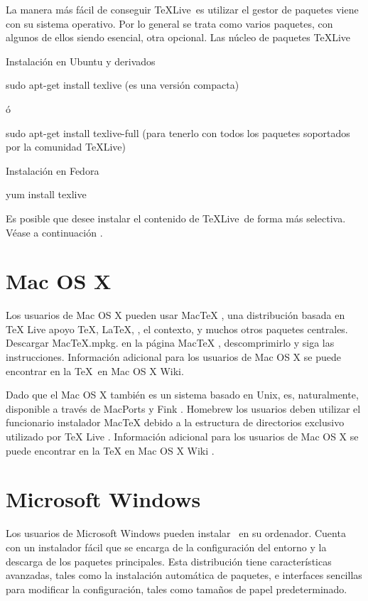 		La manera más fácil de conseguir \TeX Live\ es utilizar el gestor de paquetes viene con su sistema operativo. Por lo general se trata como varios paquetes, con algunos de ellos siendo esencial, otra opcional. Las núcleo de paquetes \TeX Live 
		
		Instalación en Ubuntu y derivados
		
		sudo apt-get install texlive
		(es una versión compacta)
		
		ó
		
		sudo apt-get install texlive-full
		(para tenerlo con todos los paquetes soportados por la comunidad \TeX Live)
		
		Instalación en Fedora
		
		yum install texlive
		
		Es posible que desee instalar el contenido de \TeX Live\ de forma más selectiva. Véase a continuación .
		
	\section{Mac OS X}
		Los usuarios de Mac OS X pueden usar MacTeX , una distribución basada en TeX Live apoyo \TeX, \LaTeX, \AMSTeX, el contexto, \XeTeX y muchos otros paquetes centrales. Descargar MacTeX.mpkg. en la página MacTeX , descomprimirlo y siga las instrucciones. Información adicional para los usuarios de Mac OS X se puede encontrar en la \TeX\ en Mac OS X Wiki.
		
		Dado que el Mac OS X también es un sistema basado en Unix, \TeXLive es, naturalmente, disponible a través de MacPorts y Fink . Homebrew los usuarios deben utilizar el funcionario instalador MacTeX debido a la estructura de directorios exclusivo utilizado por TeX Live . Información adicional para los usuarios de Mac OS X se puede encontrar en la TeX en Mac OS X Wiki .
	
	\section{Microsoft Windows}
	
		Los usuarios de Microsoft Windows pueden instalar \MiKTeX\ en su ordenador. Cuenta con un instalador fácil que se encarga de la configuración del entorno y la descarga de los paquetes principales. Esta distribución tiene características avanzadas, tales como la instalación automática de paquetes, e interfaces sencillas para modificar la configuración, tales como tamaños de papel predeterminado.
		

